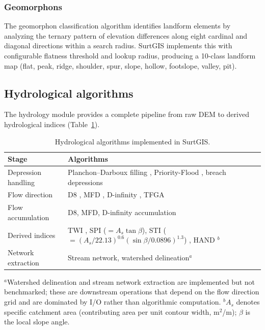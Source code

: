 \documentclass[preprint,review,12pt,authoryear]{elsarticle}
\begin{document}
\subsubsection{Geomorphons}

The geomorphon classification algorithm \citep{jasiewicz2013} identifies landform elements by analyzing the ternary pattern of elevation differences along eight cardinal and diagonal directions within a search radius. SurtGIS implements this with configurable flatness threshold and lookup radius, producing a 10-class landform map (flat, peak, ridge, shoulder, spur, slope, hollow, footslope, valley, pit).

\subsection{Hydrological algorithms}
\label{subsec:hydrology}

The hydrology module provides a complete pipeline from raw DEM to derived hydrological indices (Table~\ref{tab:hydrology}).

\begin{table}[htbp]
\centering
\caption{Hydrological algorithms implemented in SurtGIS.}
\label{tab:hydrology}
\begin{tabular}{@{}lp{9cm}@{}}
\toprule
Stage & Algorithms \\
\midrule
Depression handling & Planchon--Darboux filling \citep{planchon2001}, Priority-Flood \citep{barnes2014}, breach depressions \citep{lindsay2016} \\
Flow direction & D8 \citep{ocallaghan1984}, MFD \citep{quinn1991}, D-infinity \citep{tarboton1997}, TFGA \citep{li2024tfga} \\
Flow accumulation & D8, MFD, D-infinity accumulation \\
Derived indices & TWI \citep{kopecky2021}, SPI ($= A_s \tan\beta$), STI ($= (A_s/22.13)^{0.6} (\sin\beta/0.0896)^{1.3}$) \citep{wilson2000terrain}, HAND \citep{nobre2011}$^{b}$ \\
Network extraction & Stream network, watershed delineation$^{a}$ \\
\bottomrule
\end{tabular}
\smallskip

{\footnotesize $^{a}$Watershed delineation and stream network extraction are implemented but not benchmarked; these are downstream operations that depend on the flow direction grid and are dominated by I/O rather than algorithmic computation. $^{b}$$A_s$ denotes specific catchment area (contributing area per unit contour width, m$^2$/m); $\beta$ is the local slope angle.}
\end{table}
\end{document}
